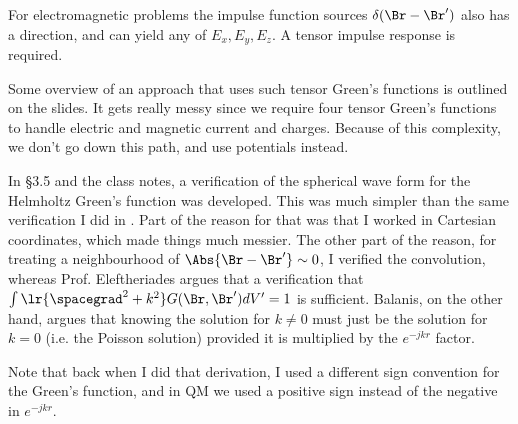 For electromagnetic problems the impulse function sources \( \delta(\Br - \Br') \) also has a direction, and can yield any of \( E_x, E_y, E_z \).  A tensor impulse response is required.

Some overview of an approach that uses such tensor Green's functions is outlined on the slides.  It gets really messy since we require four tensor Green's functions to handle electric and magnetic current and charges.  Because of this complexity, we don't go down this path, and use potentials instead.

In \S 3.5 \citep{balanis2005antenna} and the class notes, a verification of the spherical wave form for the Helmholtz Green's function was developed.  This was much simpler than the same verification I did in \citep{phy456:helmoltzGreens}.  Part of the reason for that was that I worked in Cartesian coordinates, which made things much messier.  The other part of the reason, for treating a neighbourhood of \( \Abs{\Br - \Br'} \sim 0 \), I verified the convolution, whereas Prof. Eleftheriades argues that a verification that \( \int \lr{\spacegrad^2 + k^2} G(\Br, \Br') dV' = 1\) is sufficient.  Balanis, on the other hand, argues that knowing the solution for \( k \ne 0 \) must just be the solution for \( k = 0 \) (i.e. the Poisson solution) provided it is multiplied by the \( e^{-j k r} \) factor.

Note that back when I did that derivation, I used a different sign convention for the Green's function, and in QM we used a positive sign instead of the negative in \( e^{-j k r } \).

%
%

